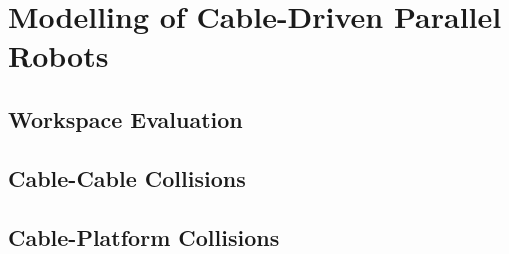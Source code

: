 \section{Modelling of Cable-Driven Parallel Robots}%
\label{sec:modelling_of_cable_driven_parallel_robots}

	\subsection{}

	\subsection{}

	\subsection{}

	\subsection{}

	\subsection{}

	\subsection{}

	\subsection{Workspace Evaluation}

	\subsection{Cable-Cable Collisions}

	\subsection{Cable-Platform Collisions}
